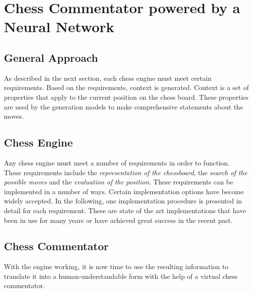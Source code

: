 \section{Chess Commentator powered by a Neural Network}

\subsection{General Approach}


As described in the next section, each chess engine must meet certain requirements. Based on the requirements, context is generated. Context is a set of properties that apply to the current position on the chess board. These properties are used by the generation models to make comprehensive statements about the moves.


\subsection{Chess Engine}

Any chess engine must meet a number of requirements in order to function. These requirements include the \textit{representation of the chessboard}, the \textit{search of the possible moves} and the \textit{evaluation of the position}. These requirements can be implemented in a number of ways. Certain implementation options have become widely accepted. In the following, one implementation procedure is presented in detail for each requirement. These are state of the art implementations that have been in use for many years or have achieved great success in the recent past. 





\subsection{Chess Commentator}

With the engine working, it is now time to use the resulting information to translate it into a human-understandable form with the help of a virtual chess commentator.